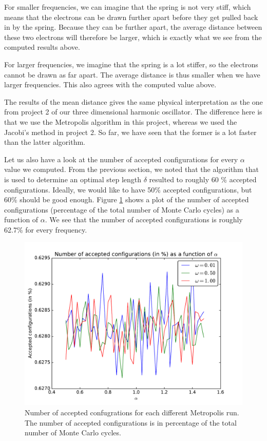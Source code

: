\documentclass[12pt]{article}
\begin{document}
For smaller frequencies, we can imagine that the spring is not very stiff, which means that the electrons can be drawn further apart before they get pulled back in by the spring. Because they can be further apart, the average distance between these two electrons will therefore be larger, which is exactly what we see from the computed results above.

For larger frequencies, we imagine that the spring is a lot stiffer, so the electrons cannot be drawn as far apart. The average distance is thus smaller when we have larger frequencies. This also agrees with the computed value above. 

The results of the mean distance gives the same physical interpretation as the one from project 2 of our three dimensional harmonic oscillator. The difference here is that we use the Metropolis algorithm in this project, whereas we used the Jacobi's method in project 2. So far, we have seen that the former is a lot faster than the latter algorithm.

Let us also have a look at the number of accepted configurations for every $\alpha$ value we computed. From the previous section, we noted that the algorithm that is used to determine an optimal step length $\delta$ resulted to roughly 60 \% accepted configurations. Ideally, we would like to have 50\% accepted configurations, but 60\% should be good enough. Figure \ref{fig:AcceptedConfigs} shows a plot of the number of accepted configurations (percentage of the total number of Monte Carlo cycles) as a function of $\alpha$. We see that the number of accepted configurations is roughly 62.7\%  for every frequency.

\begin{figure}[h]
\centering
\includegraphics[width=\linewidth]{Plots/AcceptedConfigs.pdf}
\caption{Number of accepted confugrations for each different Metropolis run. The number of accepted configurations is in percentage of the total number of Monte Carlo cycles.}
\label{fig:AcceptedConfigs}
\end{figure}
\end{document}

